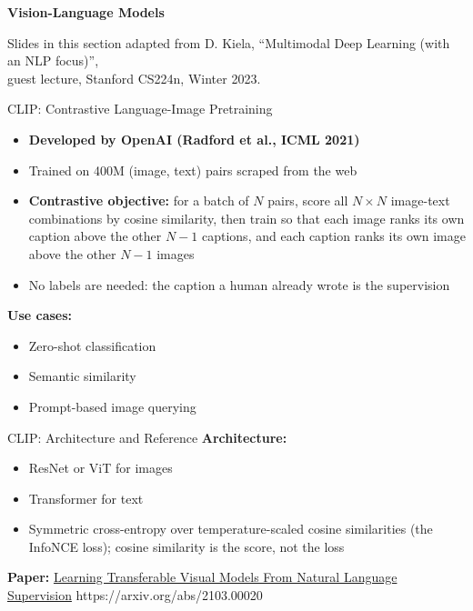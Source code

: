 \begin{frame}[plain]
  \begin{center}
    \vspace{2em}
    {\LARGE\textbf{Vision-Language Models}}

    \vspace{2.5em}
    {\scriptsize Slides in this section adapted from D. Kiela, ``Multimodal Deep Learning (with an NLP focus)'',\\
    guest lecture, Stanford CS224n, Winter 2023.}
  \end{center}
\end{frame}

\begin{frame}{CLIP: Contrastive Language-Image Pretraining}
  \begin{itemize}
    \item[] \textbf{Developed by OpenAI (Radford et al., ICML 2021)}
    \vspace{0.6em}
    \item Trained on 400M (image, text) pairs scraped from the web
    \item \textbf{Contrastive objective:} for a batch of $N$ pairs, score all $N \times N$ image-text
      combinations by cosine similarity, then train so that each image ranks its own caption above
      the other $N-1$ captions, and each caption ranks its own image above the other $N-1$ images
    \item No labels are needed: the caption a human already wrote is the supervision
  \end{itemize}

  \vspace{0.7em}
  \textbf{Use cases:}
  \begin{itemize}
    \item Zero-shot classification
    \item Semantic similarity
    \item Prompt-based image querying
  \end{itemize}
\end{frame}

\begin{frame}{CLIP: Architecture and Reference}
  \textbf{Architecture:}
  \begin{itemize}
    \item[{\color{red}\textbullet}] ResNet or ViT for images
    \item[{\color{red}\textbullet}] Transformer for text
    \item[{\color{red}\textbullet}] Symmetric cross-entropy over temperature-scaled cosine similarities
      (the InfoNCE loss); cosine similarity is the score, not the loss
  \end{itemize}

  \vspace{1em}
  \textbf{Paper:}
  \href{https://arxiv.org/abs/2103.00020}{\colorbox{yellow!20}{Learning Transferable Visual Models From Natural Language Supervision}}
  \hspace{0.5em}
  {\scriptsize\ttfamily https://arxiv.org/abs/2103.00020}
\end{frame}

